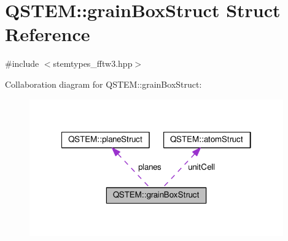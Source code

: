 \hypertarget{struct_q_s_t_e_m_1_1grain_box_struct}{\section{Q\-S\-T\-E\-M\-:\-:grain\-Box\-Struct Struct Reference}
\label{struct_q_s_t_e_m_1_1grain_box_struct}
}


{\ttfamily \#include $<$stemtypes\-\_\-fftw3.\-hpp$>$}



Collaboration diagram for Q\-S\-T\-E\-M\-:\-:grain\-Box\-Struct\-:
\nopagebreak
\begin{figure}[H]
\begin{center}
\leavevmode
\includegraphics[width=310pt]{struct_q_s_t_e_m_1_1grain_box_struct__coll__graph}
\end{center}
\end{figure}
